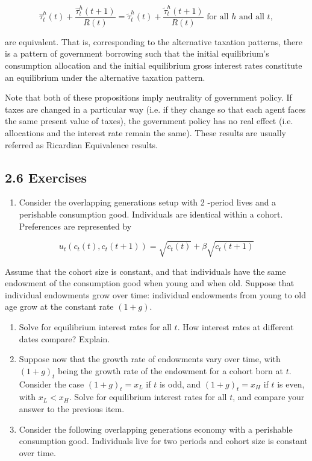 \documentclass[10pt]{article}
\begin{document}
$$
\widehat{\tau}_{t}^{h}(t)+\frac{\widehat{\tau}_{t}^{h}(t+1)}{R(t)}=\widetilde{\tau}_{t}^{h}(t)+\frac{\widetilde{\tau}_{t}^{h}(t+1)}{R(t)} \text { for all } h \text { and all } t,
$$

are equivalent. That is, corresponding to the alternative taxation patterns, there is a pattern of government borrowing such that the initial equilibrium's consumption allocation and the initial equilibrium gross interest rates constitute an equilibrium under the alternative taxation pattern.

Note that both of these propositions imply neutrality of government policy. If taxes are changed in a particular way (i.e. if they change so that each agent faces the same present value of taxes), the government policy has no real effect (i.e. allocations and the interest rate remain the same). These results are usually referred as Ricardian Equivalence results.

\subsection*{2.6 Exercises}
\begin{enumerate}
  \item Consider the overlapping generations setup with 2 -period lives and a perishable consumption good. Individuals are identical within a cohort. Preferences are represented by
\end{enumerate}

$$
u_{t}\left(c_{t}(t), c_{t}(t+1)\right)=\sqrt{c_{t}(t)}+\beta \sqrt{c_{t}(t+1)}
$$

Assume that the cohort size is constant, and that individuals have the same endowment of the consumption good when young and when old. Suppose that individual endowments grow over time: individual endowments from young to old age grow at the constant rate $(1+g)$.

\begin{enumerate}
  \item Solve for equilibrium interest rates for all $t$. How interest rates at different dates compare? Explain.
  \item Suppose now that the growth rate of endowments vary over time, with $(1+g)_{t}$ being the growth rate of the endowment for a cohort born at $t$. Consider the case $(1+g)_{t}=x_{L}$ if $t$ is odd, and $(1+g)_{t}=x_{H}$ if $t$ is even, with $x_{L}<x_{H}$. Solve for equilibrium interest rates for all $t$, and compare your answer to the previous item.
  \item Consider the following overlapping generations economy with a perishable consumption good. Individuals live for two periods and cohort size is constant over time.
\end{enumerate}
\end{document}
